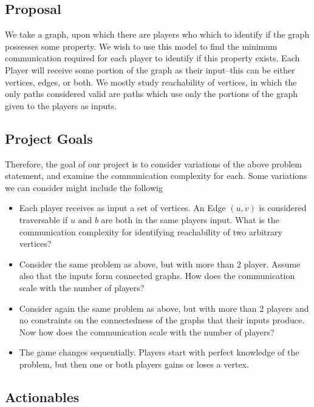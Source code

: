 
\subsection{Proposal}

We take a graph, upon which there are players who which to identify if the
graph possesses some property. We wish to use this model to find the minimum
communication required for each player to identify if this property exists.
Each Player will receive some portion of the graph as their input--this can be
either vertices, edges, or both. We mostly study reachability of vertices, in
which the only paths considered valid are paths which use only the portions of
the graph given to the players as inputs.

\subsection{Project Goals}

Therefore, the goal of our project is to consider variations of the above
problem statement, and examine the communication complexity for each. Some
variations we can consider might include the followig

\begin{itemize}
    \item Each player receives as input a set of vertices. An Edge $(u,v)$ is
	    considered traversable if $u$ and $b$ are both in the same players
	    input. What is the communication complexity for identifying
	    reachability of two arbitrary vertices?
    \item Consider the same problem as above, but with more than 2 player.
	    Assume also that the inputs form connected graphs. How does the
	    communication scale with the number of players?
    \item Consider again the same problem as above, but with more than 2
	    players and no constraints on the connectedness of the graphs that
	    their inputs produce. Now how does the communication scale with the
	    number of players?
    \item The game changes sequentially. Players start with perfect knowledge
	    of the problem, but then one or both players gains or loses a
	    vertex. 
\end{itemize}

\subsection{Actionables}


